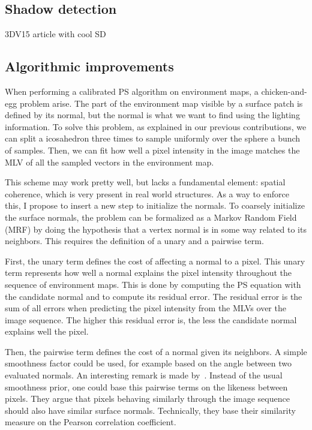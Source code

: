 \documentclass{report}
\begin{document}
\subsection{Shadow detection}
3DV15 article with cool SD


\subsection{Algorithmic improvements}


When performing a calibrated PS algorithm on environment maps, a chicken-and-egg problem arise. The part of the environment map visible by a surface patch is defined by its normal, but the normal is what we want to find using the lighting information. To solve this problem, as explained in our previous contributions, we can split a icosahedron three times to sample uniformly over the sphere a bunch of samples. Then, we can fit how well a pixel intensity in the image matches the MLV of all the sampled vectors in the environment map.

This scheme may work pretty well, but lacks a fundamental element: spatial coherence, which is very present in real world structures. As a way to enforce this, I propose to insert a new step to initialize the normals. To coarsely initialize the surface normals, the problem can be formalized as a Markov Random Field (MRF) by doing the hypothesis that a vertex normal is in some way related to its neighbors. This requires the definition of a unary and a pairwise term.

First, the unary term defines the cost of affecting a normal to a pixel. This unary term represents how well a normal explains the pixel intensity throughout the sequence of environment maps. This is done by computing the PS equation with the candidate normal and to compute its residual error. The residual error is the sum of all errors when predicting the pixel intensity from the MLVs over the image sequence. The higher this residual error is, the less the candidate normal explains well the pixel.

Then, the pairwise term defines the cost of a normal given its neighbors. A simple smoothness factor could be used, for example based on the angle between two evaluated normals. An interesting remark is made by~\cite{jung-cvpr-15}. Instead of the usual smoothness prior, one could base this pairwise terms on the likeness between pixels. They argue that pixels behaving similarly through the image sequence should also have similar surface normals. Technically, they base their similarity measure on the Pearson correlation coefficient.
\end{document}
